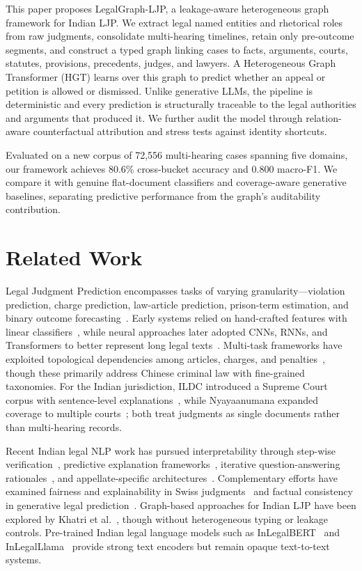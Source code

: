 \documentclass[runningheads]{llncs}
\newcommand{\method}{LegalGraph-LJP}
\begin{document}
This paper proposes \method{}, a leakage-aware heterogeneous graph framework for Indian LJP. We extract legal named entities and rhetorical roles from raw judgments, consolidate multi-hearing timelines, retain only pre-outcome segments, and construct a typed graph linking cases to facts, arguments, courts, statutes, provisions, precedents, judges, and lawyers. A Heterogeneous Graph Transformer (HGT) learns over this graph to predict whether an appeal or petition is allowed or dismissed. Unlike generative LLMs, the pipeline is deterministic and every prediction is structurally traceable to the legal authorities and arguments that produced it. We further audit the model through relation-aware counterfactual attribution and stress tests against identity shortcuts.

Evaluated on a new corpus of 72{,}556 multi-hearing cases spanning five domains, our framework achieves 80.6\% cross-bucket accuracy and 0.800 macro-F1. We compare it with genuine flat-document classifiers and coverage-aware generative baselines, separating predictive performance from the graph's auditability contribution.

\section{Related Work}
\label{sec:related-work}

Legal Judgment Prediction encompasses tasks of varying granularity---violation prediction, charge prediction, law-article prediction, prison-term estimation, and binary outcome forecasting~\cite{feng2022survey}. Early systems relied on hand-crafted features with linear classifiers~\cite{aletras2016predicting,katz2017general}, while neural approaches later adopted CNNs, RNNs, and Transformers to better represent long legal texts~\cite{chalkidis2019neural,luo2017learning,zhong2018legal}. Multi-task frameworks have exploited topological dependencies among articles, charges, and penalties~\cite{zhong2018legal,li2025kljp}, though these primarily address Chinese criminal law with fine-grained taxonomies. For the Indian jurisdiction, ILDC introduced a Supreme Court corpus with sentence-level explanations~\cite{malik2021ildc}, while Nyayaanumana expanded coverage to multiple courts~\cite{nigam2025nyayaanumana}; both treat judgments as single documents rather than multi-hearing records. 

Recent Indian legal NLP work has pursued interpretability through step-wise verification~\cite{shi2025legalreasoner}, predictive explanation frameworks~\cite{nigam2024predex}, iterative question-answering rationales~\cite{zhong2020iteratively}, and appellate-specific architectures~\cite{nair2026vichara}. Complementary efforts have examined fairness and explainability in Swiss judgments~\cite{santosh2024explainability} and factual consistency in generative legal prediction~\cite{nigam2025tathyanyaya}. Graph-based approaches for Indian LJP have been explored by Khatri et al.~\cite{khatri2023exploring}, though without heterogeneous typing or leakage controls. Pre-trained Indian legal language models such as InLegalBERT~\cite{paul2023inlegalbert} and InLegalLlama~\cite{nigam2025nyayaanumana} provide strong text encoders but remain opaque text-to-text systems. 
\end{document}
